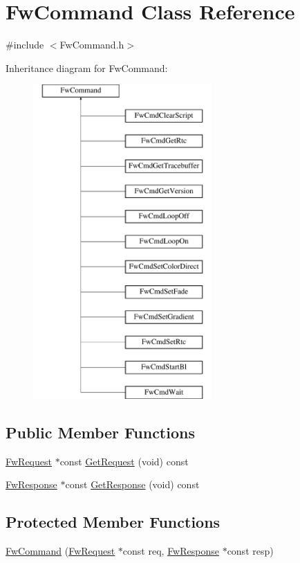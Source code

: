 \hypertarget{class_fw_command}{\section{Fw\-Command Class Reference}
\label{class_fw_command}
}


{\ttfamily \#include $<$Fw\-Command.\-h$>$}

Inheritance diagram for Fw\-Command\-:\begin{figure}[H]
\begin{center}
\leavevmode
\includegraphics[height=12.000000cm]{class_fw_command}
\end{center}
\end{figure}
\subsection*{Public Member Functions}
\begin{DoxyCompactItemize}
\item 
\hyperlink{class_fw_request}{Fw\-Request} $\ast$const \hyperlink{class_fw_command_a5f2d7cd4a6058f92fcad550b5011cde0}{Get\-Request} (void) const 
\item 
\hyperlink{class_fw_response}{Fw\-Response} $\ast$const \hyperlink{class_fw_command_abdeac054d2082c58ede4c45c78c072cb}{Get\-Response} (void) const 
\end{DoxyCompactItemize}
\subsection*{Protected Member Functions}
\begin{DoxyCompactItemize}
\item 
\hyperlink{class_fw_command_a749c2ea1c7bfd6cd8194ae96cb97ecaf}{Fw\-Command} (\hyperlink{class_fw_request}{Fw\-Request} $\ast$const req, \hyperlink{class_fw_response}{Fw\-Response} $\ast$const resp)
\end{DoxyCompactItemize}
